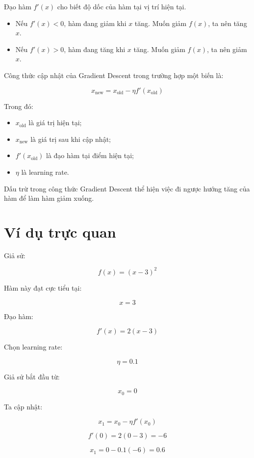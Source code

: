 \documentclass[12pt,a4paper]{report}
\begin{document}
Đạo hàm $f'(x)$ cho biết độ dốc của hàm tại vị trí hiện tại.

\begin{itemize}
    \item Nếu $f'(x) < 0$, hàm đang giảm khi $x$ tăng. Muốn giảm $f(x)$, ta nên tăng $x$.
    \item Nếu $f'(x) > 0$, hàm đang tăng khi $x$ tăng. Muốn giảm $f(x)$, ta nên giảm $x$.
\end{itemize}

Công thức cập nhật của Gradient Descent trong trường hợp một biến là:

\[
    x_{\text{new}}
    =
    x_{\text{old}}
    -
    \eta f'(x_{\text{old}})
\]

Trong đó:

\begin{itemize}
    \item $x_{\text{old}}$ là giá trị hiện tại;
    \item $x_{\text{new}}$ là giá trị sau khi cập nhật;
    \item $f'(x_{\text{old}})$ là đạo hàm tại điểm hiện tại;
    \item $\eta$ là learning rate.
\end{itemize}

\begin{ghinho}
Dấu trừ trong công thức Gradient Descent thể hiện việc đi ngược hướng tăng của hàm để làm hàm giảm xuống.
\end{ghinho}

\section{Ví dụ trực quan}

Giả sử:

\[
    f(x) = (x-3)^2
\]

Hàm này đạt cực tiểu tại:

\[
    x=3
\]

Đạo hàm:

\[
    f'(x)=2(x-3)
\]

Chọn learning rate:

\[
    \eta = 0.1
\]

Giả sử bắt đầu từ:

\[
    x_0 = 0
\]

Ta cập nhật:

\[
    x_{1}=x_0-\eta f'(x_0)
\]

\[
    f'(0)=2(0-3)=-6
\]

\[
    x_1=0-0.1(-6)=0.6
\]
\end{document}

